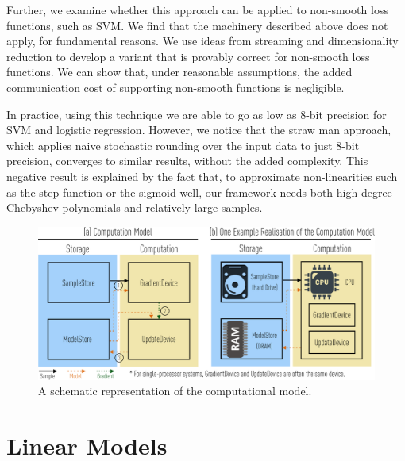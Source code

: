 \documentclass{article}
\begin{document}
Further, we examine whether this approach can be applied to non-smooth loss functions, such as SVM. 
We find that the machinery described above does not apply, for fundamental reasons. 
We use ideas from streaming and dimensionality reduction to develop a variant that is provably correct for non-smooth loss functions. 
We can show that, under reasonable assumptions, the added communication cost of supporting non-smooth functions is negligible. 

\vspace{-0.5em}
In practice, using this technique we are
able to go as low as 8-bit precision for SVM and logistic regression. 
However, we notice that the straw man approach, which applies naive stochastic rounding over the input data to just 8-bit precision, converges to similar results, 
without the added complexity. 
This negative result is explained by the fact that, to approximate non-linearities such as the step function or the sigmoid well, our framework needs both high degree Chebyshev polynomials and relatively large samples. 

\begin{figure}[t]
\centering   
\includegraphics[scale=0.27]{compmodel-pdfcrop}
\vspace{-1em}
\caption{A schematic representation of the computational model.}
\vspace{-0.5em}
\label{fig:model}
\end{figure}


\vspace{-0.5em}
\section{Linear Models}
\end{document}

